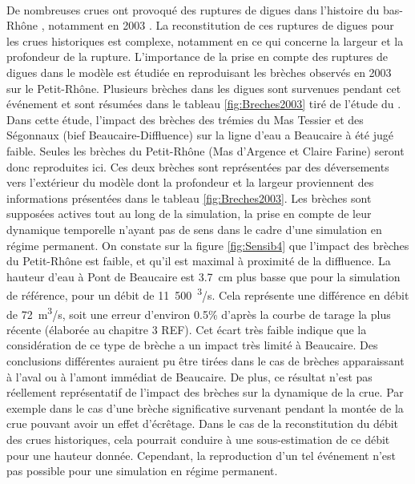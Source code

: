 	\paragraph{} De nombreuses crues ont provoqué des ruptures de digues dans l'histoire du bas-Rhône \citep{pichard_sept_2014}, notamment en 2003 \citep{medd_debit_2005}. La reconstitution de ces ruptures de digues pour les crues historiques est complexe, notamment en ce qui concerne la largeur et la profondeur de la rupture. L'importance de la prise en compte des ruptures de digues dans le modèle est étudiée en reproduisant les brèches observés en 2003 sur le Petit-Rhône. Plusieurs brèches dans les digues sont survenues pendant cet événement et sont résumées dans le tableau \ref{fig:Breches2003} tiré de l'étude du \citet{symadrem_programme_2012}. Dans cette étude, l'impact des brèches des trémies du Mas Tessier et des Ségonnaux (bief Beaucaire-Diffluence) sur la ligne d'eau a Beaucaire à été jugé faible. Seules les brèches du Petit-Rhône (Mas d'Argence et Claire Farine) seront donc reproduites ici. Ces deux brèches sont représentées par des déversements vers l'extérieur du modèle dont la profondeur et la largeur proviennent des informations présentées dans le tableau \ref{fig:Breches2003}. Les brèches sont supposées actives tout au long de la simulation, la prise en compte de leur dynamique temporelle n'ayant pas de sens dans le cadre d'une simulation en régime permanent. On constate sur la figure \ref{fig:Sensib4} que l'impact des brèches du Petit-Rhône est faible, et qu'il est maximal à proximité de la diffluence. La hauteur d'eau à Pont de Beaucaire est 3.7~cm plus basse que pour la simulation de référence, pour un débit de 11~500~\textsuperscript{3}/s. Cela représente une différence en débit de 72~m\textsuperscript{3}/s, soit une erreur d'environ 0.5\% d'après la courbe de tarage la plus récente (élaborée au chapitre 3 REF). Cet écart très faible indique que la considération de ce type de brèche a un impact très limité à Beaucaire. Des conclusions différentes auraient pu être tirées dans le cas de brèches apparaissant à l'aval ou à l'amont immédiat de Beaucaire. De plus, ce résultat n'est pas réellement représentatif de l'impact des brèches sur la dynamique de la crue. Par exemple dans le cas d'une brèche significative survenant pendant la montée de la crue pouvant avoir un effet d'écrêtage. Dans le cas de la reconstitution du débit des crues historiques, cela pourrait conduire à une sous-estimation de ce débit pour une hauteur donnée. Cependant, la reproduction d'un tel événement n'est pas possible pour une simulation en régime permanent.
	
